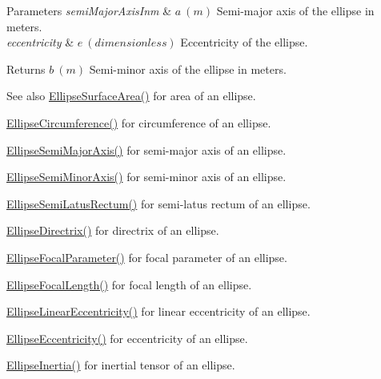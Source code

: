 \begin{DoxyParams}{Parameters}
{\em semi\+Major\+Axis\+Inm} & $ a\ (m)$ Semi-\/major axis of the ellipse in meters. \\
\hline
{\em eccentricity} & $ e\ (dimensionless)$ Eccentricity of the ellipse. \\
\hline
\end{DoxyParams}
\begin{DoxyReturn}{Returns}
$ b\ (m)$ Semi-\/minor axis of the ellipse in meters. 
\end{DoxyReturn}
\begin{DoxySeeAlso}{See also}
\mbox{\hyperlink{group___e_g_x_math-_geometry-2_d-_ellipse-_surface_area_ga4ce8c8323e9718ce5458f4ab7f6d823d}{Ellipse\+Surface\+Area()}} for area of an ellipse. 

\mbox{\hyperlink{group___e_g_x_math-_geometry-2_d-_ellipse-_circumference_ga4172802ac674eb53467b44928ac635c7}{Ellipse\+Circumference()}} for circumference of an ellipse. 

\mbox{\hyperlink{group___e_g_x_math-_geometry-2_d-_ellipse-_semi_major_axis_ga646a2ca065f4ac3f666a9ea22f3bb527}{Ellipse\+Semi\+Major\+Axis()}} for semi-\/major axis of an ellipse. 

\mbox{\hyperlink{group___e_g_x_math-_geometry-2_d-_ellipse-_semi_minor_axis_gae461acf3333565d69527dd86e9aa2b32}{Ellipse\+Semi\+Minor\+Axis()}} for semi-\/minor axis of an ellipse. 

\mbox{\hyperlink{group___e_g_x_math-_geometry-2_d-_ellipse-_semi_latus_rectum_gacfd1844eb4ef3d1ee3c0b460a6442ae6}{Ellipse\+Semi\+Latus\+Rectum()}} for semi-\/latus rectum of an ellipse. 

\mbox{\hyperlink{group___e_g_x_math-_geometry-2_d-_ellipse-_directrix_gace8f72a8efbc9c18d3eb689151405106}{Ellipse\+Directrix()}} for directrix of an ellipse. 

\mbox{\hyperlink{group___e_g_x_math-_geometry-2_d-_ellipse-_focal_parameter_ga4cd01a38c72c092ef9791351948bf69b}{Ellipse\+Focal\+Parameter()}} for focal parameter of an ellipse. 

\mbox{\hyperlink{group___e_g_x_math-_geometry-2_d-_ellipse-_focal_length_gab8d63de7640c880cfecaeada6f2afdac}{Ellipse\+Focal\+Length()}} for focal length of an ellipse. 

\mbox{\hyperlink{group___e_g_x_math-_geometry-2_d-_ellipse-_linear_eccentricity_gac70b3010e30aa8b73deb50fe2b9b9a91}{Ellipse\+Linear\+Eccentricity()}} for linear eccentricity of an ellipse. 

\mbox{\hyperlink{group___e_g_x_math-_geometry-2_d-_ellipse-_eccentricity_ga6a0a7fba17f782616894cfc447628c33}{Ellipse\+Eccentricity()}} for eccentricity of an ellipse. 

\mbox{\hyperlink{group___e_g_x_math-_geometry-2_d-_ellipse-_inertia_ga10a3049c2f04b50f271fb01dc62e4cf8}{Ellipse\+Inertia()}} for inertial tensor of an ellipse. 
\end{DoxySeeAlso}
